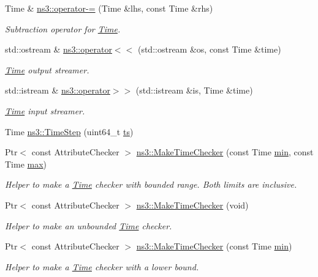 \begin{DoxyCompactItemize}
Time \& \hyperlink{group__time_gac1d7a9e01023a0ecc5b07b597aec9291}{ns3\+::operator-\/=} (Time \&lhs, const Time \&rhs)
\begin{DoxyCompactList}\small\item\em Subtraction operator for \hyperlink{classns3_1_1Time}{Time}. \end{DoxyCompactList}\item 
std\+::ostream \& \hyperlink{group__time_ga4ca94481b071ac60d3126f33d61238bd}{ns3\+::operator$<$$<$} (std\+::ostream \&os, const Time \&time)
\begin{DoxyCompactList}\small\item\em \hyperlink{classns3_1_1Time}{Time} output streamer. \end{DoxyCompactList}\item 
std\+::istream \& \hyperlink{group__time_ga9232f6c8d5d3fa355217b0874291054b}{ns3\+::operator$>$$>$} (std\+::istream \&is, Time \&time)
\begin{DoxyCompactList}\small\item\em \hyperlink{classns3_1_1Time}{Time} input streamer. \end{DoxyCompactList}\item 
Time \hyperlink{group__time_ga464a3c1cbb458c6c3ed3bd5ce9506758}{ns3\+::\+Time\+Step} (uint64\+\_\+t \hyperlink{mmwave_2model_2fading-traces_2fading__trace__generator_8m_ada841f58d7be618bfbc76c87e7d44086}{ts})
\item 
Ptr$<$ const Attribute\+Checker $>$ \hyperlink{group__time_ga7032965bd4afa578691d88c09e4481c1}{ns3\+::\+Make\+Time\+Checker} (const Time \hyperlink{80211b_8c_ac6afabdc09a49a433ee19d8a9486056d}{min}, const Time \hyperlink{80211b_8c_affe776513b24d84b39af8ab0930fef7f}{max})
\begin{DoxyCompactList}\small\item\em Helper to make a \hyperlink{classns3_1_1Time}{Time} checker with bounded range. Both limits are inclusive. \end{DoxyCompactList}\item 
Ptr$<$ const Attribute\+Checker $>$ \hyperlink{group__time_ga07f8cce9b9e4f52d0f0b16da276b55c2}{ns3\+::\+Make\+Time\+Checker} (void)
\begin{DoxyCompactList}\small\item\em Helper to make an unbounded \hyperlink{classns3_1_1Time}{Time} checker. \end{DoxyCompactList}\item 
Ptr$<$ const Attribute\+Checker $>$ \hyperlink{group__time_ga23093575d816379c08eb5955461531d4}{ns3\+::\+Make\+Time\+Checker} (const Time \hyperlink{80211b_8c_ac6afabdc09a49a433ee19d8a9486056d}{min})
\begin{DoxyCompactList}\small\item\em Helper to make a \hyperlink{classns3_1_1Time}{Time} checker with a lower bound. \end{DoxyCompactList}\end{DoxyCompactItemize}



